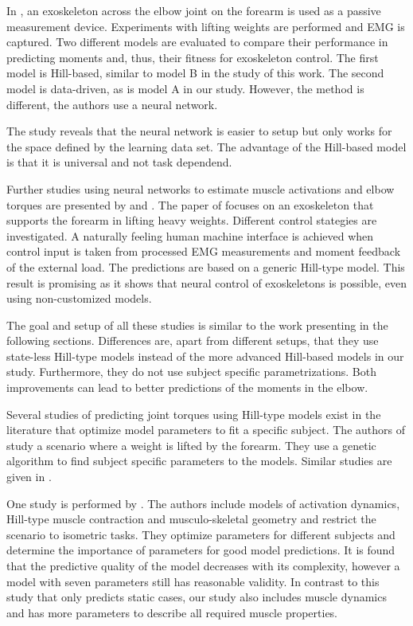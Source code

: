 In \cite{Rosen1999}, an exoskeleton across the elbow joint on the forearm is used as a passive measurement device. Experiments with lifting weights are performed and EMG is captured.
Two different models are evaluated to compare their performance in predicting moments and, thus, their fitness for exoskeleton control.
The first model is Hill-based, similar to model B in the study of this work.
The second model is data-driven, as is model A in our study. However, the method is different, the authors use a neural network.

The study reveals that the neural network is easier to setup but only works for the space defined by the learning data set. The advantage of the Hill-based model is that it is universal and not task dependend. 

Further studies using neural networks to estimate muscle activations and elbow torques are presented by \cite{Wang2002} and \cite{Song2005}.
%
The paper of \cite{Rosen2001} focuses on an exoskeleton that supports the forearm in lifting heavy weights. Different control stategies are investigated. A naturally feeling human machine interface is achieved when
control input is taken from processed EMG measurements and moment feedback of the external load. 
The predictions are based on a generic Hill-type model. This result is promising as it shows that neural control of exoskeletons is possible, even using non-customized models. 

The goal and setup of all these studies is similar to the work presenting in the following sections. Differences are, apart from different setups, that they use state-less Hill-type models instead of the more advanced Hill-based models in our study. Furthermore, they do not use subject specific parametrizations. Both improvements can lead to better predictions of the moments in the elbow.

%
Several studies of predicting joint torques using Hill-type models exist in the literature that optimize model parameters to fit a specific subject.
The authors of \cite{Cavallaro2005, Cavallaro2006} study a scenario where a weight is lifted by the forearm. They use a genetic algorithm to find subject specific parameters to the models. Similar studies are given in \cite{Lloyd2003,Venture2005,Pontonnier2009,Sartori2012}.

One study is performed by \cite{Heine2003}. The authors include models of activation dynamics, Hill-type muscle contraction and musculo-skeletal geometry and restrict the scenario to isometric tasks. They optimize parameters for different subjects and determine the importance of parameters for good model predictions. It is found that the predictive quality of the model decreases with its complexity, however a model with seven parameters still has reasonable validity. 
In contrast to this study that only predicts static cases, our study also includes muscle dynamics and has more parameters to describe all required muscle properties.

